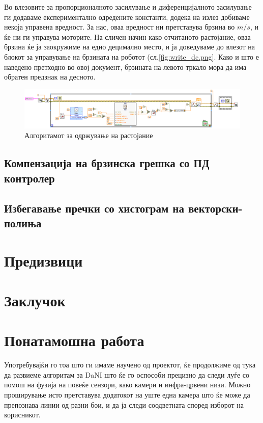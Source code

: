 \documentclass{article}
\begin{document}
Во влезовите за пропорционалното засилување и диференцијалното засилување ги додаваме експериментално одредените константи, додека на излез добиваме некоја управена вредност. За нас, оваа вредност ни претставува брзина во $m/s$, и ќе ни ги управува моторите. На сличен начин како отчитаното растојание, оваа брзина ќе ја заокружиме на едно децимално место, и ја доведуваме до влезот на блокот за управување на брзината на роботот (сл.\ref{fig:write_dc.png}. Како и што е наведено претходно во овој документ, брзината на левото тркало мора да има обратен предзнак на десното. 

\begin{figure}[H]
\centering
\includegraphics[width = 0.80\paperheight,angle=90]{PID_Control.png}
\caption{Алгоритамот за одржување на растојание}
\label{fig:PID_Control.png}
\end{figure}
\subsection{Компензација на брзинска грешка со ПД контролер}
\subsection{Избегавање пречки со хистограм на векторски-полиња}
\section{Предизвици}
\section{Заклучок}
\section{Понатамошна работа}
Употребувајќи го тоа што ги имаме научено од проектот, ќе продолжиме од тука да развиеме алгоритам за DaNI што ќе го оспособи прецизно да следи луѓе со помош на фузија на повеќе сензори, како камери и инфра-црвени низи. Можно проширување исто претставува додатокот на уште една камера што ќе може да препознава линии од разни бои, и да ја следи соодветната според изборот на корисникот.
\end{document}
